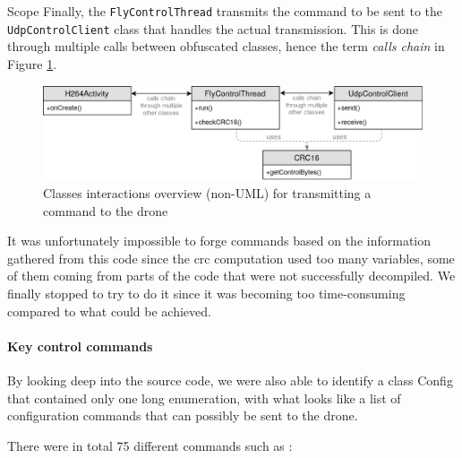 \begin{chaptercover}{Scope}
Finally, the \texttt{FlyControlThread} transmits the command to be sent to the \texttt{UdpControlClient} class that handles the actual transmission. This is done through multiple calls between obfuscated classes, hence the term \textit{calls chain} in Figure \ref{fig:apk-class-interactions}.

\begin{figure}[H]
  \centering
  \includegraphics[width=.85\linewidth]{figures/apk-class-interactions}
  \caption{Classes interactions overview (non-UML) for transmitting a command to the drone}
  \label{fig:apk-class-interactions}
\end{figure}

It was unfortunately impossible to forge commands based on the information gathered from this code since the \acrshort{crc} computation used too many variables, some of them coming from parts of the code that were not successfully decompiled. We finally stopped to try to do it since it was becoming too time-consuming compared to what could be achieved.

\paragraph{Key control commands} By looking deep into the source code, we were also able to identify a class Config that contained only one long enumeration, with what looks like a list of configuration commands that can possibly be sent to the drone.

There were in total 75 different commands such as :


\end{chaptercover}
